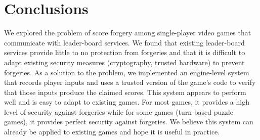 \documentclass [11pt, twocolumn] {article}
\begin{document}
\section { Conclusions } 
\label{sec:conclusions}

We explored the problem of score forgery among single-player video games that communicate with leader-board services. We found that existing leader-board services provide little to no protection from forgeries and that it is difficult to adapt existing security measures (cryptography, trusted hardware) to prevent forgeries. As a solution to the problem, we implemented an engine-level system that records player inputs and uses a trusted version of the game's code to verify that those inputs produce the claimed scores. This system appears to perform well and is easy to adapt to existing games. For most games, it provides a high level of security against forgeries while for some games (turn-based puzzle games), it provides perfect security against forgeries. We believe this system can already be applied to existing games and hope it is useful in practice. 



\end{document}
